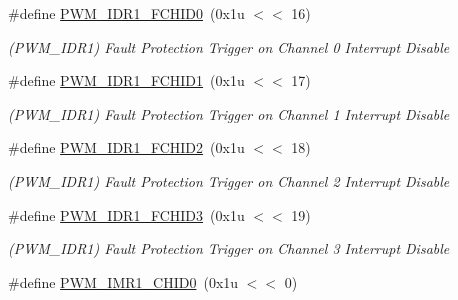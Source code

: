 \begin{DoxyCompactItemize}
\mbox{\label{group__SAME70__PWM_ga5d0b864d7c46d711e67f258576bdb695}} 
\#define \mbox{\hyperlink{group__SAME70__PWM_ga5d0b864d7c46d711e67f258576bdb695}{P\+W\+M\+\_\+\+I\+D\+R1\+\_\+\+F\+C\+H\+I\+D0}}~(0x1u $<$$<$ 16)
\begin{DoxyCompactList}\small\item\em (P\+W\+M\+\_\+\+I\+D\+R1) Fault Protection Trigger on Channel 0 Interrupt Disable \end{DoxyCompactList}\item 
\mbox{\label{group__SAME70__PWM_ga976e7c6018476e56eb5499fe014ecd91}} 
\#define \mbox{\hyperlink{group__SAME70__PWM_ga976e7c6018476e56eb5499fe014ecd91}{P\+W\+M\+\_\+\+I\+D\+R1\+\_\+\+F\+C\+H\+I\+D1}}~(0x1u $<$$<$ 17)
\begin{DoxyCompactList}\small\item\em (P\+W\+M\+\_\+\+I\+D\+R1) Fault Protection Trigger on Channel 1 Interrupt Disable \end{DoxyCompactList}\item 
\mbox{\label{group__SAME70__PWM_gae1441d80727769a23cf3938e11040fe2}} 
\#define \mbox{\hyperlink{group__SAME70__PWM_gae1441d80727769a23cf3938e11040fe2}{P\+W\+M\+\_\+\+I\+D\+R1\+\_\+\+F\+C\+H\+I\+D2}}~(0x1u $<$$<$ 18)
\begin{DoxyCompactList}\small\item\em (P\+W\+M\+\_\+\+I\+D\+R1) Fault Protection Trigger on Channel 2 Interrupt Disable \end{DoxyCompactList}\item 
\mbox{\label{group__SAME70__PWM_gaba474b42f512547290bc189f1241469a}} 
\#define \mbox{\hyperlink{group__SAME70__PWM_gaba474b42f512547290bc189f1241469a}{P\+W\+M\+\_\+\+I\+D\+R1\+\_\+\+F\+C\+H\+I\+D3}}~(0x1u $<$$<$ 19)
\begin{DoxyCompactList}\small\item\em (P\+W\+M\+\_\+\+I\+D\+R1) Fault Protection Trigger on Channel 3 Interrupt Disable \end{DoxyCompactList}\item 
\mbox{\label{group__SAME70__PWM_ga9ee97f78b7948e40e46566ffbbcbe47c}} 
\#define \mbox{\hyperlink{group__SAME70__PWM_ga9ee97f78b7948e40e46566ffbbcbe47c}{P\+W\+M\+\_\+\+I\+M\+R1\+\_\+\+C\+H\+I\+D0}}~(0x1u $<$$<$ 0)
$$
\end{DoxyCompactItemize}
